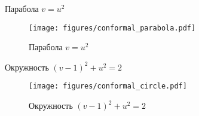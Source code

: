 \begin{frame}{Парабола \(v = u^2\)}
	\begin{figure}
		\centering
		\texttt{[image: figures/conformal\_parabola.pdf]}
		\caption{Парабола \(v=u^2\)}\label{fig:conformal_parabola}
	\end{figure}
\end{frame}

\begin{frame}{Окружность \((v-1)^2 + u^2 = 2\)}
	\begin{figure}
		\centering
		\texttt{[image: figures/conformal\_circle.pdf]}
		\caption{Окружность \((v-1)^2 + u^2 = 2\)}\label{fig:conformal_circle}
	\end{figure}
\end{frame}
